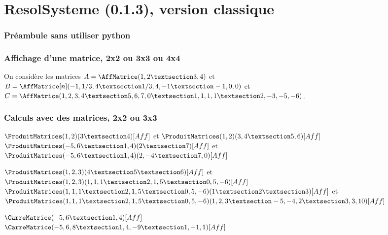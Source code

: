 \documentclass[french,a4paper,10pt]{article}
\def\RSver{0.1.3}
\begin{document}
\part*{ResolSysteme (\RSver), version \og classique \fg{}}

\section{Préambule sans utiliser python}


\section{Affichage d'une matrice, 2x2 ou 3x3 ou 4x4}

\begin{ShowCodeTeX}
On considère les matrices $A=\AffMatrice(1,2 § 3,4)$
et $B=\AffMatrice[n](-1,1/3,4 § 1/3,4,-1 § -1,0,0)$
et $C=\AffMatrice(1,2,3,4 § 5,6,7,0 § 1,1,1,1 § 2,-3,-5,-6)$.
\end{ShowCodeTeX}

\section{Calculs avec des matrices, 2x2 ou 3x3}

\begin{ShowCodeTeX}
$\ProduitMatrices(1,2)(3 § 4)[Aff]$ et $\ProduitMatrices(1,2)(3,4 § 5,6)[Aff]$ \\
$\ProduitMatrices(-5,6 § 1,4)(2 § 7)[Aff]$ et $\ProduitMatrices(-5,6 § 1,4)(2,-4 § 7,0)[Aff]$
\end{ShowCodeTeX}

\begin{ShowCodeTeX}
$\ProduitMatrices(1,2,3)(4 § 5 § 6)[Aff]$ et $\ProduitMatrices(1,2,3)(1,1,1 § 2,1,5 § 0,5,-6)[Aff]$\\
$\ProduitMatrices(1,1,1 § 2,1,5 § 0,5,-6)(1 § 2 § 3)[Aff]$ et
$\ProduitMatrices(1,1,1 § 2,1,5 § 0,5,-6)(1,2,3 § -5,-4,2 § 3,3,10)[Aff]$
\end{ShowCodeTeX}

\begin{ShowCodeTeX}
$\CarreMatrice(-5,6 § 1,4)[Aff]$ \\
$\CarreMatrice(-5,6,8 § 1,4,-9 § 1,-1,1)[Aff]$
\end{ShowCodeTeX}
\end{document}
